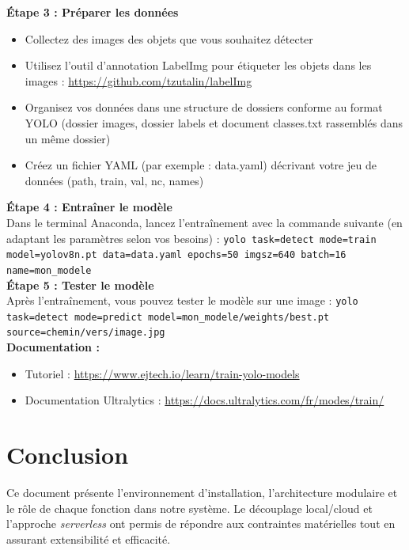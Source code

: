 \documentclass[a4paper,11pt]{article}
\begin{document}
		\textbf{Étape 3 : Préparer les données}
		\begin{itemize}
			\item Collectez des images des objets que vous souhaitez détecter
			\item Utilisez l'outil d'annotation LabelImg pour étiqueter les objets dans les images : \url{https://github.com/tzutalin/labelImg}
			\item Organisez vos données dans une structure de dossiers conforme au format YOLO (dossier images, dossier labels et document classes.txt rassemblés dans un même dossier)
			\item Créez un fichier YAML (par exemple : data.yaml) décrivant votre jeu de données (path, train, val, nc, names)\\
		\end{itemize}
		
		\textbf{Étape 4 : Entraîner le modèle}\\
		Dans le terminal Anaconda, lancez l'entraînement avec la commande suivante (en adaptant les paramètres selon vos besoins) : \texttt{yolo task=detect mode=train model=yolov8n.pt data=data.yaml epochs=50 imgsz=640 batch=16 name=mon\_modele}\\
		
		\textbf{Étape 5 : Tester le modèle}\\
		Après l'entraînement, vous pouvez tester le modèle sur une image : \texttt{yolo task=detect mode=predict model=mon\_modele/weights/best.pt source=chemin/vers/image.jpg}\\

		\textbf{Documentation :}
		\begin{itemize}
			\item Tutoriel :  \url{https://www.ejtech.io/learn/train-yolo-models}
			\item Documentation Ultralytics : \url{https://docs.ultralytics.com/fr/modes/train/}\\
		\end{itemize}
	
	
	\section{Conclusion}
	Ce document présente l’environnement d’installation, l’architecture modulaire et le rôle de chaque fonction dans notre système. Le découplage local/cloud et l’approche \textit{serverless} ont permis de répondre aux contraintes matérielles tout en assurant extensibilité et efficacité.
	
	\vspace{1em}
	
\end{document}
